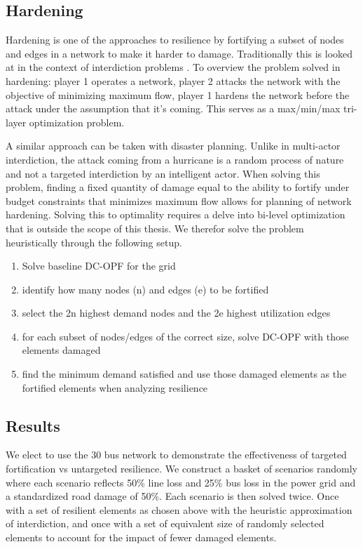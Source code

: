 \documentclass{article}
\begin{document}
	\subsection{Hardening}
	
	Hardening is one of the approaches to resilience by fortifying a subset of nodes and edges in a network to make it harder to damage. Traditionally this is looked at in the context of interdiction problems \cite{ChurchEA2007}. To overview the problem solved in hardening: player 1 operates a network, player 2 attacks the network with the objective of minimizing maximum flow, player 1 hardens the network before the attack under the assumption that it's coming. This serves as a max/min/max tri-layer optimization problem.
	
	A similar approach can be taken with disaster planning. Unlike in multi-actor interdiction, the attack coming from a hurricane is a random process of nature and not a targeted interdiction by an intelligent actor. When solving this problem, finding a fixed quantity of damage equal to the ability to fortify under budget constraints that minimizes maximum flow allows for planning of network hardening. Solving this to optimality requires a delve into bi-level optimization that is outside the scope of this thesis. We therefor solve the problem heuristically through the following setup.
	
	\begin{enumerate}
		
	\item Solve baseline DC-OPF for the grid
	\item identify how many nodes (n) and edges (e) to be fortified
	\item select the 2n highest demand nodes and the 2e highest utilization edges
	\item for each subset of nodes/edges of the correct size, solve DC-OPF with those elements damaged
	\item find the minimum demand satisfied and use those damaged elements as the fortified elements when analyzing resilience 
	\end{enumerate}
	\subsection{Results}
	We elect to use the 30 bus network to demonstrate the effectiveness of targeted fortification vs untargeted resilience. We construct a basket of scenarios randomly where each scenario reflects 50\% line loss and 25\% bus loss in the power grid and a standardized road damage of 50\%. Each scenario is then solved twice. Once with a set of resilient elements as chosen above with the heuristic approximation of interdiction, and once with a set of equivalent size of randomly selected elements to account for the impact of fewer damaged elements.
	
\end{document}
